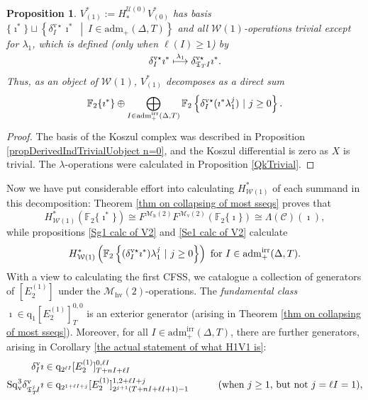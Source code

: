 \documentclass[11pt]{amsart} \renewcommand{\baselinestretch}{1.2}
\theoremstyle{plain}
\newtheorem{prop}[thm]{Proposition}
\numberwithin{equation}{section} %
\theoremstyle{plain}
\newtheorem{prop}[thm]{Proposition}
\numberwithin{equation}{chapter} %
\newcommand{\scrC}{\mathscr{C}}
\newcommand{\calU}{\mathcal{U}}
\newcommand{\calw}{\mathcal{W}}
\newcommand{\calmv}{\mathcal{M}\dver}
\newcommand{\calmh}{\mathcal{M}\dhor}
\newcommand{\calMhv}{\mathcal{M}_\mathrm{hv}}
\newcommand{\CommOperad}{{\scrC}}
\newcommand{\quadgrad}[1]{\mathrm{q}_{#1}}
\newcommand{\aDT}{\mathrm{adm}_+(\Delta,T)}
\newcommand{\aDTirr}{\mathrm{adm}_+^\mathrm{irr}(\Delta,T)}
\newcommand{\F}{\mathbb{F}}
\newcommand{\Ftwo}{\F_2}
\newcommand{\TOP}{\mathfrak{T}}
\newcommand{\E}[5]{[E^{#1}_{#2}#3]^{#4}_{#5}}
\newcommand{\uver}{^\mathrm{v}}
\newcommand{\dver}{_\mathrm{v}}
\newcommand{\dhor}{_\mathrm{h}}
\newcommand{\Sqv}{\mathrm{Sq}\dver}
\newcommand{\deltav}{\delta\uver}
\newcommand{\deltavstar}{\delta^{\mathrm{v}\star}}
\newcommand{\CFSS}{CFSS}
\begin{document}
\begin{Calculations of HWn}
\begin{prop}
\label{calc of V1 from W0 sphere}
$V^*_{(1)}:=H_*^{\calU(0)}V^*_{(0)}$ has basis $\{\imath^*\}\sqcup\left\{\deltavstar_I\imath^*\ \middle|\ I\in\aDT\right\}$ and all $\calw(1)$-operations trivial except for $\lambda_1$, which is defined (only when $\ell(I)\geq1$) by
\[\deltavstar_I\imath^*\overset{\smash{\lambda_1}}{\longmapsto }\deltavstar_{\TOP_T I}\imath^*.\]
Thus, as an object of $\calw(1)$, $V^*_{(1)}$ decomposes as a direct sum
\[\Ftwo \{\imath^*\}\oplus\bigoplus_{\smash{I\in \aDTirr}}\Ftwo \left\{\deltavstar_I(\imath^*\lambda_1^j)\ |\ j\geq0\right\}.\]
\end{prop}
\begin{proof}
The basis of the Koszul complex was described in Proposition \ref{propDerivedIndTrivialUobject n=0}, and the Koszul differential is zero as $X$ is trivial. The $\lambda$-operations were calculated in Proposition \ref{QkTrivial}.
\end{proof}
Now we have put considerable effort into calculating $H^*_{\calw(1)}$ of each summand in this decomposition: Theorem \ref{thm on collapsing of most sseqs} proves that
\[H^*_{\calw(1)}(\Ftwo \{\imath^*\})\cong F^{\calmh(2)}F^{\calmv(2)}(\Ftwo \{\imath\})\cong \Lambda(\CommOperad)(\imath),\]
while propositions \ref{Sg1 calc of V2} and \ref{Se1 calc of V2} calculate
\[H^*_{\calw(1)}\left(\Ftwo \left\{(\deltavstar_I\imath^*)\lambda_1^j\ |\ j\geq0\right\}\right)\textup{ for $I\in\aDTirr$.}\]
With a view to calculating the first \CFSS,
we catalogue a collection of generators of $\E{(1)}{2}{}{}{}$ under the $\calMhv(2)$-operations. The \emph{fundamental class} $\imath\in 
\quadgrad{1}\E{(1)}{2}{}{0,0}{T}$ is an exterior generator (arising in Theorem \ref{thm on collapsing of most sseqs}). %
Moreover, for all $I\in\aDTirr$, there are further generators, arising in Corollary \ref{the actual statement of what H1V1 is}:
\begin{alignat}{2}
\label{first generator}\deltav_I\imath&\in \quadgrad{2^{\ell I}}\E{(1)}{2}{}{0,\ell I}{T+nI+\ell I}&\qquad&\\
\Sqv^{3}\deltav_{\TOP_T^j\!I}\imath&\in 
\quadgrad{2^{1+\ell I+j}}\E{(1)}{2}{}{1,2+\ell I+j}{2^{j+1}(T+nI+\ell I+1)-1}
&\qquad&\textup{(when $j\geq1$, but not $j=\ell I=1$),}\\

\end{alignat}
\end{Calculations of HWn}
\end{document}
